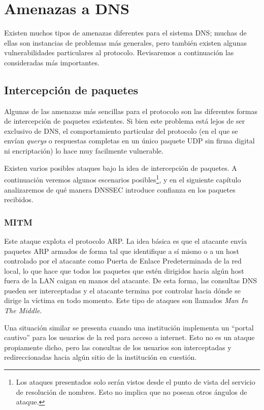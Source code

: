 \chapter{Amenazas a DNS}

Existen muchos tipos de amenazas diferentes para el sistema DNS; muchas de ellas son instancias de problemas m\'as generales, pero tambi\'en existen algunas vulnerabilidades particulares al protocolo. Revisaremos a continuaci\'on las consideradas m\'as importantes\cite{rfc3833}.

\section{Intercepci\'on de paquetes}

Algunas de las amenazas m\'as sencillas para el protocolo son las diferentes formas de intercepci\'on de paquetes existentes. Si bien este problema est\'a lejos de ser exclusivo de DNS, el comportamiento particular del protocolo (en el que se env\'ian \textit{querys} o respuestas completas en un \'unico paquete UDP sin firma digital ni encriptaci\'on) lo hace muy facilmente vulnerable. 

Existen varios posibles ataques bajo la idea de intercepci\'on de paquetes. A continuaci\'on veremos algunos escenarios posibles\footnote{Los ataques presentados solo ser\'an vistos desde el punto de vista del servicio de resoluci\'on de nombres. Esto no implica que no posean otros \'angulos de ataque.}, y en el siguiente cap\'itulo analizaremos de qu\'e manera DNSSEC introduce confianza en los paquetes recibidos.

\subsection{MITM}

Este ataque explota el protocolo ARP. La idea b\'asica es que el atacante
env\'ia paquetes ARP armados de forma tal que identifique a s\'i mismo o a un
host controlado por el atacante como Puerta de Enlace Predeterminada de la red
local, lo que hace que todos los paquetes que est\'en dirigidos hacia alg\'un
host fuera de la LAN caigan en manos del atacante. De esta forma, las consultas
DNS pueden ser interceptadas y el atacante termina por controlar hacia d\'onde
se dirige la v\'ictima en todo momento. Este tipo de ataques son llamados
\textit{Man In The Middle}.

Una situaci\'on similar se presenta cuando una instituci\'on implementa un ``portal
cautivo'' para los usuarios de la red para acceso a internet. Esto no es un
ataque propiamente dicho, pero las consultas de los usuarios son interceptadas
y redireccionadas hacia alg\'un sitio de la instituci\'on en cuesti\'on.

